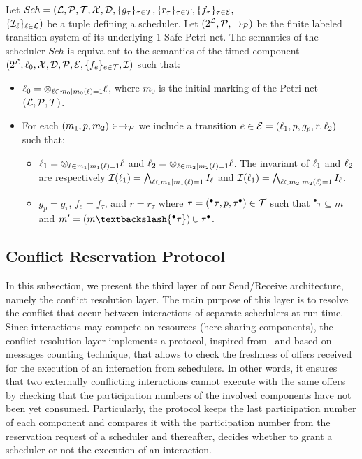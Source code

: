 \begin{property}\label{pr:sch_sr_sem}
  Let $Sch=(\mathcal{L}, \mathcal{P},\mathcal{T},\mathcal{X}, \mathcal{D},\{g_{\tau}\}_{\tau\in\mathcal{T}},\{r_{\tau}\}_{\tau\in\mathcal{T}},
    \{f_{\tau}\}_{\tau\in\mathcal{E}},$\\$\{\mathcal{I}_{\ell}\}_{\ell\in\mathcal{L}})$ be a tuple defining 
  a scheduler. Let $(2^{\mathcal{L}},\mathcal{P},\to_{\mathcal{P}})$ be the finite labeled transition
  system of its underlying 1-Safe Petri net. The semantics of the scheduler $Sch$ 
  is equivalent to the semantics of the timed component 
  $(2^{\mathcal{L}},\ell_0,\mathcal{X},\mathcal{D},\mathcal{P},\mathcal{E},\{f_{e}\}_{e\in\mathcal{T}},\mathcal{I})$ such that:
  \begin{itemize}
    \item $\ell_0=\otimes_{\ell\in m_0|m_0(\ell)=1}\ell$, where $m_0$ is the initial marking 
      of the Petri net $(\mathcal{L}, \mathcal{P},\mathcal{T})$.
    \item For each $(m_1,p,m_2)\in\to_{\mathcal{P}}$ we include a transition $e\in\mathcal{E}=
      (\ell_1,p,g_p,r,\ell_2)$ such that:
      \begin{itemize}
        \item $\ell_1=\otimes_{\ell\in m_1|m_1(\ell)=1}\ell$ and
              $\ell_2=\otimes_{\ell\in m_2|m_2(\ell)=1}\ell$. The invariant of $\ell_1$ and 
              $\ell_2$ are respectively 
              $\mathcal{I}(\ell_1)=\bigwedge_{\ell\in m_1|m_1(\ell)=1}I_{\ell}$ and
              $\mathcal{I}(\ell_1)=\bigwedge_{\ell\in m_2|m_2(\ell)=1}I_{\ell}$.
            \item $g_p=g_{\tau}$, $f_e=f_{\tau}$, and $r=r_{\tau}$ where 
              $\tau=({^\bullet\tau},p,{\tau^\bullet })\in\mathcal{T}$ such that
            ${^\bullet\tau}\subseteq m$ and $m'=(m\textbackslash{^\bullet\tau})
  \cup{\tau^\bullet }$.
      \end{itemize}
  \end{itemize}
\end{property}



\subsection{Conflict Reservation Protocol}
In this subsection, we present the third layer of our Send/Receive architecture, namely
the conflict resolution layer. The main purpose of this layer is to resolve the conflict
that occur between interactions of separate schedulers at run time. 
Since interactions may compete on resources (here sharing components), the conflict resolution
layer implements a protocol, inspired from~\cite{msg_cnt} and based on messages counting 
technique,
that allows to check the freshness of offers received for the execution of an interaction
from schedulers. In other words, it ensures that two externally conflicting interactions
cannot execute with the same offers by checking that the participation numbers of the involved 
components have not been yet consumed. Particularly, the protocol keeps the last participation
number of each component and compares it with the participation number from the reservation 
request of a scheduler and thereafter, decides whether to grant a scheduler or not the execution
of an interaction.

